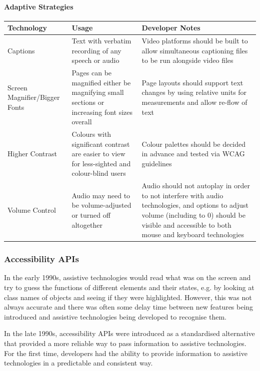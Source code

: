\documentclass[ %
                    author={Aleena Baig},
                supervisor={Dr Simon Lock},
                    degree={BSc},
                     title={On Making Web Accessible Graphs},
                  subtitle={},
                      year={2019} ]{dissertation}
\begin{document}

\paragraph{Adaptive Strategies}

\begin{center}
\begin{longtable}{|p{3cm}|p{5cm}|p{5cm}|}
 \hline
 Technology & Usage & Developer Notes \\ [0.5ex]
 \hline \hline
 Captions & Text with verbatim recording of any speech or audio & Video platforms should be built to allow simultaneous captioning files to be run alongside video files \\
 \hline
 Screen Magnifier/Bigger Fonts & Pages can be magnified either be magnifying small sections or increasing font sizes overall & Page layouts should support text changes by using relative units for measurements and allow re-flow of text \\
 \hline
 Higher Contrast & Colours with significant contrast are easier to view for less-sighted and colour-blind users & Colour palettes should be decided in advance and tested via WCAG guidelines \\
 \hline
 Volume Control & Audio may need to be volume-adjusted or turned off altogether & Audio should not autoplay in order to not interfere with audio technologies, and options to adjust volume (including to 0) should be visible and accessible to both mouse and keyboard technologies \\ [1ex]
 \hline
\end{longtable}
\end{center}


\subsubsection{Accessibility APIs}

In the early 1990s, assistive technologies would read what was on the screen and try to guess the functions of different elements and their states, e.g. by looking at class names of objects and seeing if they were highlighted. However, this was not always accurate and there was often some delay time between new features being introduced and assistive technologies being developed to recognise them. \cite{smashingAPIs}

In the late 1990s, accessibility APIs were introduced as a standardised alternative that provided a more reliable way to pass information to assistive technologies. For the first time, developers had the ability to provide information to assistive technologies in a predictable and consistent way.
\end{document}
